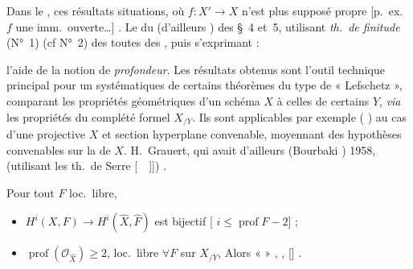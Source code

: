 \documentclass[11pt,a4paper]{article}
\begin{document}
Dans le \ill{} \ill{},  \struck{\ill{}} \ill{} ces résultats \ill{} \ill{}   situations, où $f\colon X' \to X$ n'est plus supposé propre [p.~ex.\ $f$ une imm.\ ouverte\ldots] \ill{} \ill{} \ill{} \ill{} \ill{} \ill{} \struck{\ill{} \ill{}} \ill{}. \struck{\ill{} \ill{} \ill{}} Le  du \ill{} (d'ailleurs \ill{} \ill{}) \ill{} \ill{} des §~4 et~5, \ill{} utilisant  \ill{} \emph{th.\ de finitude} (N°~1) \ill{} \ill{} (cf N°~2) \struck{\ill{} \ill{} \ill{}} \struck{\ill{}} \ill{} \ill{} \ill{} des \ill{}  \struck{\ill{} \ill{}} toutes des \ill{} , puis s'exprimant :

l'aide de la notion de \emph{profondeur}.
Les  résultats obtenus sont l'outil technique principal pour un \struck{\ill{}}  systématiques de   certains théorèmes du type de « Lefschetz », comparant les propriétés géométriques d'un schéma $X$  à celles de certains  \ill{} $Y$, \struck{\ill{}} \emph{via} les propriétés du complété formel $X_{/Y}$. \struck{\ill{} \ill{} \ill{} \ill{}} \struck{\ill{} \ill{}} Ils sont applicables par exemple (\ill{} \ill{} \ill{} \ill{} \ill{} ) au cas d'une \ill{} projective $X$ et  section hyperplane \ill{} convenable, moyennant des hypothèses \struck{\ill{} \ill{}} convenables sur la \ill{} de $X$. \struck{\ill{} \ill{}} \ill{} \struck{\ill{}} \ill{} \ill{} H.~Grauert, qui avait d'ailleurs \ill{} (Bourbaki \ill{}) \struck{\ill{}} 1958, (utilisant les th.\ de \ill{} \ill{} Serre [\ \ ]]) \struck{\ill{} \ill{} \ill{}}.

Pour tout $F$ loc.\ libre,
\begin{itemize}
  \item[(i)] $H^i(X, F) \to H^i(\hat{X}, \hat{F})$ est bijectif [\ill{} $i \leq \operatorname{prof} F - 2$] \struck{\ill{}} \ill{} \struck{\ill{}} \ill{} \ill{} \ill{} \ill{} ;
  \item[(ii)] \ill{} \ill{} \ill{} \ill{} \ill{} $\operatorname{prof}(\mathcal{O}_{\hat{X}}) \geq 2$, \struck{\ill{} \ill{}} loc.\ libre $\forall F$ sur $X_{/Y}$, Alors \ill{} \ill{} \ill{} « \ill{} » \ill{}, \ill{} \ill{}, \ill{} \ill{} \ill{} [\ill{}] \ill{} \ill{}.
\end{itemize}
\end{document}
